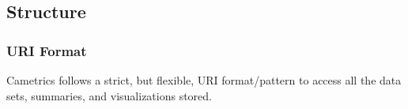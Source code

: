 \documentclass[10pt,a4paper,english]{article}
\begin{document}

\hypertarget{structure}{}
\subsection*{Structure}
\label{structure}



\hypertarget{uri-format}{}
\subsubsection*{URI Format}
\label{uri-format}

Cametrics follows a strict, but flexible, URI format/pattern to access all the data sets, summaries, and visualizations stored.
\end{document}
